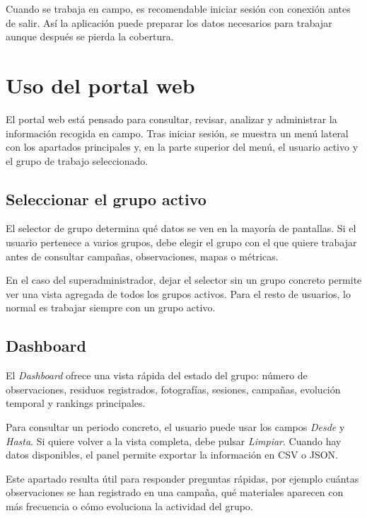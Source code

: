 
Cuando se trabaja en campo, es recomendable iniciar sesión con conexión antes de
salir. Así la aplicación puede preparar los datos necesarios para trabajar aunque
después se pierda la cobertura.

\section{Uso del portal web}

El portal web está pensado para consultar, revisar, analizar y administrar la
información recogida en campo. Tras iniciar sesión, se muestra un menú lateral con
los apartados principales y, en la parte superior del menú, el usuario activo y el
grupo de trabajo seleccionado.


\subsection{Seleccionar el grupo activo}

El selector de grupo determina qué datos se ven en la mayoría de pantallas. Si el
usuario pertenece a varios grupos, debe elegir el grupo con el que quiere trabajar
antes de consultar campañas, observaciones, mapas o métricas.

En el caso del superadministrador, dejar el selector sin un grupo concreto permite
ver una vista agregada de todos los grupos activos. Para el resto de usuarios, lo
normal es trabajar siempre con un grupo activo.

\subsection{Dashboard}

El \textit{Dashboard} ofrece una vista rápida del estado del grupo: número de
observaciones, residuos registrados, fotografías, sesiones, campañas, evolución
temporal y rankings principales.

Para consultar un periodo concreto, el usuario puede usar los campos \textit{Desde}
y \textit{Hasta}. Si quiere volver a la vista completa, debe pulsar \textit{Limpiar}.
Cuando hay datos disponibles, el panel permite exportar la información en CSV o JSON.

Este apartado resulta útil para responder preguntas rápidas, por ejemplo cuántas
observaciones se han registrado en una campaña, qué materiales aparecen con más
frecuencia o cómo evoluciona la actividad del grupo.

